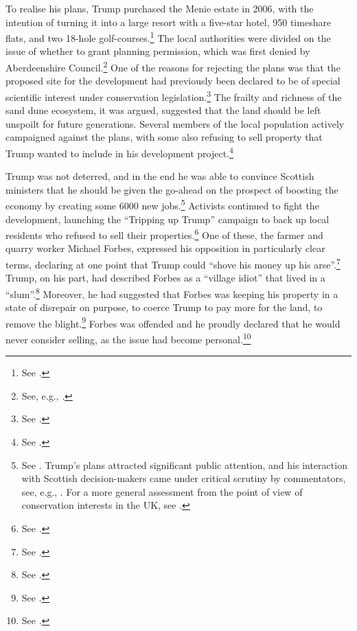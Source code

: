 To realise his plans, Trump purchased the Menie estate in 2006, with the intention of turning it into a large resort with a five-star hotel, 950 timeshare flats, and two 18-hole golf-courses.\footnote{See \cite{siddique08}.} The local authorities were divided on the issue of whether to grant planning permission, which was first denied by Aberdeenshire Council.\footnote{See, e.g., \cite{bbc07}.} One of the reasons for rejecting the plans was that the proposed site for the development had previously been declared to be of special scientific interest under conservation legislation.\footnote{See \cite{bbc07b}.} The frailty and richness of the sand dune ecosystem, it was argued, suggested that the land should be left unspoilt for future generations. Several members of the local population actively campaigned against the plans, with some also refusing to sell property that Trump wanted to include in his development project.\footnote{See \cite{scotsman10}.}

Trump was not deterred, and in the end he was able to convince Scottish ministers that he should be given the go-ahead on the prospect of boosting the economy by creating some 6000 new jobs.\footnote{See \cite{carrell08}. Trump's plans attracted significant public attention, and his interaction with Scottish decision-makers came under critical scrutiny by commentators, see, e.g., \cite{jenkins08}. For a more general assessment from the point of view of conservation interests in the UK, see \cite{koen13}.} Activists continued to fight the development, launching the ``Tripping up Trump'' campaign to back up local residents who refused to sell their properties.\footnote{See \cite{tripping15}.} One of these, the farmer and quarry worker Michael Forbes, expressed his opposition in particularly clear terms, declaring at one point that Trump could ``shove his money up his arse''.\footnote{See \cite{scotsman10}.} Trump, on his part, had described Forbes as a ``village idiot'' that lived in a ``slum''.\footnote{See \cite{bbc10}.} Moreover, he had suggested that Forbes was keeping his property in a state of disrepair on purpose, to coerce Trump to pay more for the land, to remove the blight.\footnote{See \cite{cnn07}.} Forbes was offended and he proudly declared that he would never consider selling, as the issue had become personal.\footnote{See \cite{ferguson12}.}

